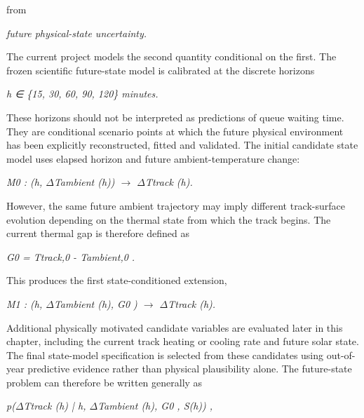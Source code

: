 from

\begin{center}\textit{future physical-state uncertainty.}\end{center}

The current project models the second quantity conditional on the first. The frozen scientific future-state model is calibrated at the discrete horizons

\begin{center}\textit{h ∈ \{15, 30, 60, 90, 120\} minutes.}\end{center}

These horizons should not be interpreted as predictions of queue waiting time. They are conditional scenario points at which the future physical environment has been explicitly reconstructed, fitted and validated. The initial candidate state model uses elapsed horizon and future ambient-temperature change:

\begin{center}\textit{M0 :        (h, \ensuremath{\Delta}Tambient (h)) \ensuremath{\rightarrow} \ensuremath{\Delta}Ttrack (h).}\end{center}

However, the same future ambient trajectory may imply different track-surface evolution depending on the thermal state from which the track begins. The current thermal gap is therefore defined as

\begin{center}\textit{G0 = Ttrack,0 - Tambient,0 .}\end{center}

This produces the first state-conditioned extension,

\begin{center}\textit{M1 :        (h, \ensuremath{\Delta}Tambient (h), G0 ) \ensuremath{\rightarrow} \ensuremath{\Delta}Ttrack (h).}\end{center}

Additional physically motivated candidate variables are evaluated later in this chapter, including the current track heating or cooling rate and future solar state. The final state-model specification is selected from these candidates using out-of-year predictive evidence rather than physical plausibility alone. The future-state problem can therefore be written generally as

\begin{center}\textit{p(\ensuremath{\Delta}Ttrack (h) | h, \ensuremath{\Delta}Tambient (h), G0 , S(h)) ,}\end{center}

